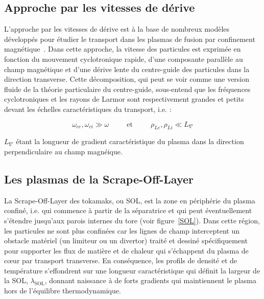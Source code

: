 \begin{refsection}
\section{Approche par les vitesses de dérive}
\label{vitessesDerive}
L'approche par les vitesses de dérive est à la base de nombreux modèles
développés pour étudier le transport dans les plasmas de fusion par
confinement magnétique~\parencite{Garcia,Bisai,Tamain}. Dans cette approche, la
vitesse des particules est exprimée en fonction du mouvement cyclotronique rapide, d'une composante
parallèle au champ magnétique et d'une dérive lente du centre-guide des particules dans
la direction transverse. Cette décomposition, qui peut se voir comme une
version fluide de la théorie particulaire du centre-guide, sous-entend que les
fréquences cyclotroniques et les rayons de Larmor sont respectivement grandes
et petits devant les échelles caractéristiques du transport, i.e. :

\begin{equation}
\omega_{ce},\omega_{ci}\gg\omega\;\;\;\;\;\;\;\;\;\text{et}\;\;\;\;\;\;\;\;\;\rho_{Le},\rho_{Li}\ll
L_\nabla \end{equation} 

$L_\nabla$ étant la longueur de gradient caractéristique du
plasma dans la direction perpendiculaire au champ magnéique. 
 
\subsection{Les plasmas de la Scrape-Off-Layer}
La Scrape-Off-Layer des tokamaks, ou SOL, est la zone en
périphérie du plasma confiné, i.e. qui commence à partir de la séparatrice et
qui peut éventuellement s'étendre jusqu'aux parois internes du tore (voir
figure~\ref{SOL}). Dans cette région, les
particules ne sont plus confinées car les lignes de champ interceptent un
obstacle matériel (un limiteur ou un divertor) traité et dessiné spécifiquement
pour supporter les flux de matière et de chaleur qui s'échappent du plasma de
c\oe ur par transport transverse.
En conséquence, les profils de densité et de température s'effondrent sur une
longueur caractéristique qui définit la largeur de la SOL, $\lambda_\text{SOL}$,
donnant naissance à de forts gradients qui maintiennent le plasma hors
de l'équilibre thermodynamique.


\end{refsection}
